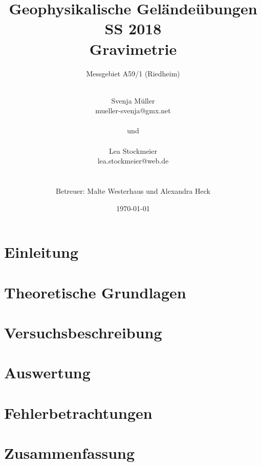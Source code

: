 \documentclass{include/protokollclass}
\title{Geophysikalische Geländeübungen \\ SS 2018 \\ Gravimetrie}
\subtitle{Messgebiet A59/1 (Riedheim)}
\author{\\ Svenja Müller \\ mueller-svenja@gmx.net
\\ \\und\\ \\
Lea Stockmeier \\ lea.stockmeier@web.de \\ \\ \\
Betreuer: Malte Westerhaus und Alexandra Heck}
\date{\vfill\vfill\vfill \today}
\begin{document}
    \FrontMatter
    \maketitle


    \begingroup \let\clearpage\relax    %
    \tableofcontents                    %
    \listoffigures
    \endgroup



    \MainMatter
    
    

    \chapter{Einleitung}
    

    \chapter{Theoretische Grundlagen}
    


    
    \chapter{Versuchsbeschreibung}
    
    
    \chapter{Auswertung}
    
    
    \chapter{Fehlerbetrachtungen}
    

    \chapter{Zusammenfassung}
    
\end{document}
